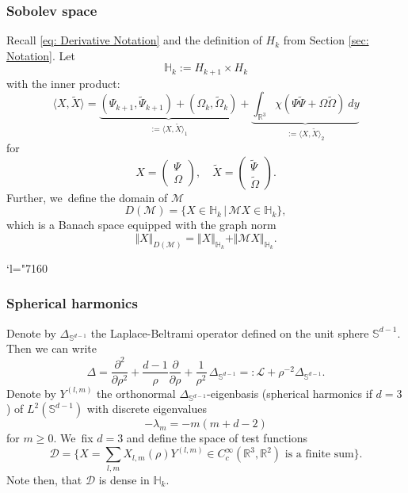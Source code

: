 \documentclass[10pt]{amsart}
\newcommand{\Changel}{\mathcode`l="7160}
\theoremstyle{plain}
\theoremstyle{definition}
\begin{document}
\subsubsection*{Sobolev space}
Recall \eqref{eq: Derivative Notation} and the definition of $H_k$ from Section \ref{sec: Notation}. Let\vspace*{-3pt}
\begin{equation}
\label{eq: Sobolev Space}
\mathbb H_{k}:= H_{k+1}\times H_k
\end{equation}
with the inner product:\vspace*{-3pt}
\begin{equation}
\label{eq: Principal Part}
\langle X,\tilde X\rangle=\underbrace{(\Psi_{k+1},\tilde \Psi_{k+1})+(\Omega_k,\tilde \Omega_k)}_{:=\langle X,\tilde X\rangle_1}+\underbrace{\int_{\mathbb R^3} \chi(\Psi \tilde \Psi +\Omega\tilde \Omega)\ dy}_{:=\langle X,\tilde X\rangle_2}
\end{equation}
for\vspace*{-3pt}
\[
X=\begin{pmatrix} \Psi\\\Omega\end{pmatrix},\quad \tilde X=\begin{pmatrix} \tilde\Psi\\\tilde\Omega\end{pmatrix}.
\]
Further, we~define the domain of $\mathcal M$
\[
D(\mathcal M)=\{X\in\mathbb H_k\,|\, \mathcal M X\in\mathbb H_k\},
\]
which is a Banach space equipped with the graph norm
\[
\Vert X\Vert_{D(\mathcal M)}=\Vert X\Vert_{\mathbb H_k}+\Vert \mathcal MX\Vert_{\mathbb H_k}.
\]

\Changel

\subsubsection*{Spherical harmonics}
Denote by $\Delta_{\mathbb S^{d-1}}$ the Laplace-Beltrami operator defined on the unit sphere $\mathbb S^{d-1}$. Then we can write
\begin{equation}
\label{eq: SH}
\Delta=\frac{\partial^2}{\partial\rho^2}+\frac{d-1}{\rho}\frac{\partial}{\partial\rho}+\frac{1}{\rho^2}\, \Delta_{\mathbb S^{d-1}}=: \mathcal L+\rho^{-2}\Delta_{\mathbb S^{d-1}}.
\end{equation}
Denote by $Y^{(l,m)}$ the orthonormal $\Delta_{\mathbb S^{d-1}}$-eigenbasis (\eg spherical harmonics if $d=3$) of $L^2(\mathbb S^{d-1})$ with discrete eigenvalues
\begin{equation}
\label{eq: Eigenvalue SH}
-\lambda_m=-m(m+d-2)
\end{equation}
for $m\ge0$. We~fix $d=3$ and define the space of test functions
\[
\mathcal D = \textstyle\big\{X=\sum_{l,m} X_{l,m}(\rho)Y^{(l,m)} \in C_c^\infty(\mathbb R^3,\mathbb R^2)\text{ is a finite sum}\big\}.
\]
Note then, that $\mathcal D$ is dense in $\mathbb H_k$.
\end{document}
